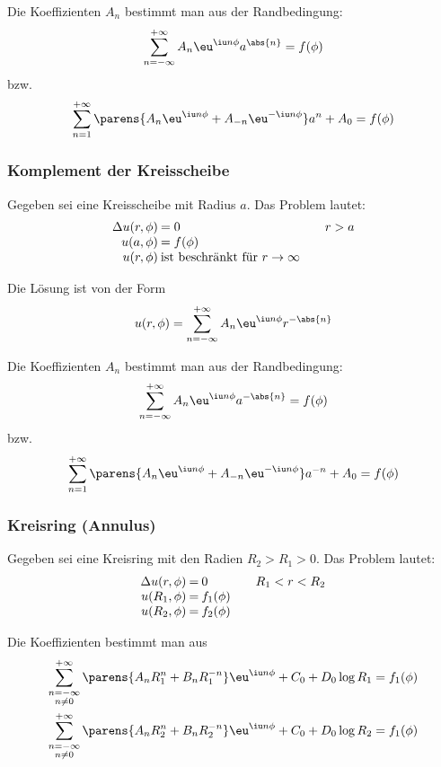 			Die Koeffizienten $A_n$ bestimmt man aus der Randbedingung:
			\[
				\sum_{n=-\infty}^{+\infty} A_n \eu^{\iu n \phi} a^{\abs{n}} = f(\phi)
			\]
			bzw.
			\[
				\sum_{n=1}^{+\infty} \parens{
					A_n \eu^{\iu n \phi} + A_{-n} \eu^{-\iu n \phi}
				} a^n + A_0 = f(\phi)
			\]
		\subsubsection{Komplement der Kreisscheibe} %
			Gegeben sei eine Kreisscheibe mit Radius $a$.
			Das Problem lautet:
			\begin{equation*}
				\begin{array}{r@{\:}l@{\qquad}l}
					\Delta u (r,\phi) &= 0 & r > a \\
					u(a,\phi) &= f(\phi) \\
					u(r,\phi) &\text{ist beschränkt für $r\to\infty$}
				\end{array}
			\end{equation*}
			
			Die Lösung ist von der Form
			\[
				u(r,\phi) = \sum_{n=-\infty}^{+\infty} A_n \eu^{\iu n \phi} r^{-\abs{n}}
			\]

			Die Koeffizienten $A_n$ bestimmt man aus der Randbedingung:
			\[
				\sum_{n=-\infty}^{+\infty} A_n \eu^{\iu n \phi} a^{-\abs{n}} = f(\phi)
			\]
			bzw.
			\[
				\sum_{n=1}^{+\infty} \parens{
					A_n \eu^{\iu n \phi} + A_{-n} \eu^{-\iu n \phi}
				} a^{-n} + A_0 = f(\phi)
			\]
		\subsubsection{Kreisring (Annulus)} %
			Gegeben sei eine Kreisring mit den Radien $R_2 > R_1 > 0$.
			Das Problem lautet:
			\begin{equation*}
				\begin{array}{r@{\:=\:}l@{\qquad}l}
					\Delta u(r,\phi) & 0 & R_1 < r < R_2 \\
					u(R_1,\phi) & f_1(\phi) \\
					u(R_2,\phi) & f_2(\phi)
				\end{array}
			\end{equation*}
			
			Die Koeffizienten bestimmt man aus
			\begin{align*}
				\sum_{\substack{n=-\infty\\ n\neq 0}}^{+\infty} \parens{
					A_n R_1^n + B_n R_1^{-n}
				} \eu^{\iu n \phi} + C_0 + D_0 \log R_1 &= f_1(\phi) \\
				\sum_{\substack{n=-\infty\\ n\neq 0}}^{+\infty} \parens{
					A_n R_2^n + B_n R_2^{-n}
				} \eu^{\iu n \phi} + C_0 + D_0 \log R_2 &= f_1(\phi)
			\end{align*}
